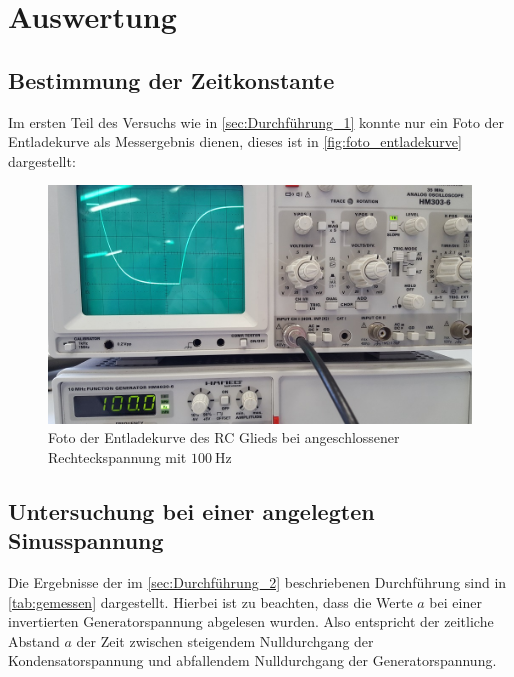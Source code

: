 \section{Auswertung}
\label{sec:Auswertung}



\subsection{Bestimmung der Zeitkonstante}
\label{sec:Auswertung_Zeitkonstante}

Im ersten Teil des Versuchs wie in \autoref{sec:Durchführung_1} konnte nur ein Foto der Entladekurve als Messergebnis dienen, dieses ist in \autoref{fig:foto_entladekurve} dargestellt:

\begin{figure}
    \centering
    \includegraphics[width=\textwidth]{images/foto_01.jpg}
    \caption{Foto der Entladekurve des RC Glieds bei angeschlossener Rechteckspannung mit $\SI{100}{\hertz}$}
    \label{fig:foto_entladekurve}
\end{figure}

\subsection{Untersuchung bei einer angelegten Sinusspannung}
\label{sec:Auswertung_Sinusspannung}

Die Ergebnisse der im \autoref{sec:Durchführung_2} beschriebenen Durchführung sind in \autoref{tab:gemessen} dargestellt. Hierbei ist zu beachten, dass die Werte $a$ bei einer invertierten Generatorspannung abgelesen wurden. Also entspricht der zeitliche Abstand $a$ der Zeit zwischen steigendem Nulldurchgang der Kondensatorspannung und abfallendem Nulldurchgang der Generatorspannung.

